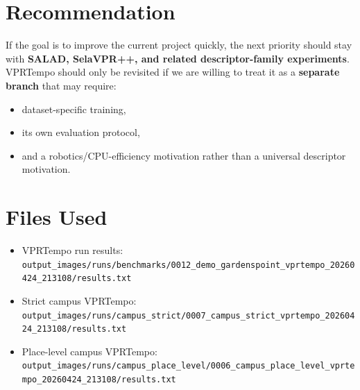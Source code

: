 \documentclass[11pt]{article}
\begin{document}
\section*{Recommendation}
If the goal is to improve the current project quickly, the next priority should stay with \textbf{SALAD, SelaVPR++, and related descriptor-family experiments}. VPRTempo should only be revisited if we are willing to treat it as a \textbf{separate branch} that may require:
\begin{itemize}[leftmargin=*]
  \item dataset-specific training,
  \item its own evaluation protocol,
  \item and a robotics/CPU-efficiency motivation rather than a universal descriptor motivation.
\end{itemize}

\section*{Files Used}
\begin{itemize}[leftmargin=*]
  \item VPRTempo run results: \texttt{output\_images/runs/benchmarks/0012\_demo\_gardenspoint\_vprtempo\_20260424\_213108/results.txt}
  \item Strict campus VPRTempo: \texttt{output\_images/runs/campus\_strict/0007\_campus\_strict\_vprtempo\_20260424\_213108/results.txt}
  \item Place-level campus VPRTempo: \texttt{output\_images/runs/campus\_place\_level/0006\_campus\_place\_level\_vprtempo\_20260424\_213108/results.txt}
\end{itemize}
\end{document}
